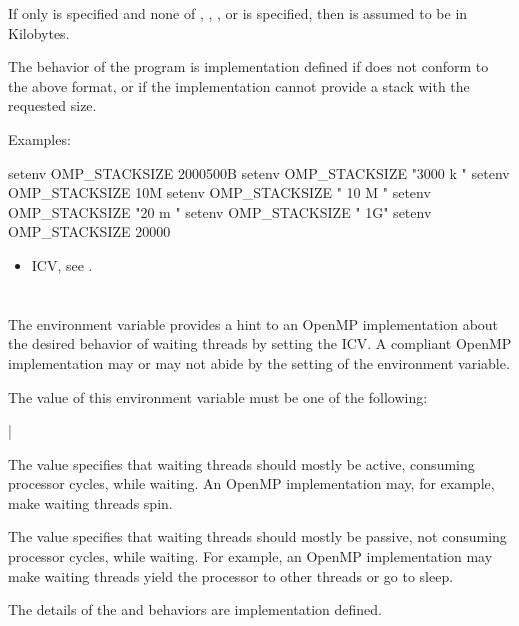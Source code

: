 If only  is specified and none of , , , 
or  is specified, then  is assumed to be in Kilobytes.

The behavior of the program is implementation defined if  
does not conform to the above format, or if the implementation cannot provide 
a stack with the requested size.

Examples:
\begin{ompEnv}
setenv OMP_STACKSIZE 2000500B
setenv OMP_STACKSIZE "3000 k "
setenv OMP_STACKSIZE 10M
setenv OMP_STACKSIZE " 10 M "
setenv OMP_STACKSIZE "20 m "
setenv OMP_STACKSIZE " 1G"
setenv OMP_STACKSIZE 20000
\end{ompEnv}

\crossreferences
\begin{itemize}
\item {} ICV, see .
\end{itemize}



\section{}
\label{sec:OMP_WAIT_POLICY}
The  environment variable provides a hint to an OpenMP
implementation about the desired behavior of waiting threads by setting the
 ICV. A compliant OpenMP implementation may or may not 
abide by the setting of the environment variable.

The value of this environment variable must be one of the following:

{|}

The  value specifies that waiting threads should mostly be 
active, consuming processor cycles, while waiting. An OpenMP implementation 
may, for example, make waiting threads spin.

The  value specifies that waiting threads should mostly be 
passive, not consuming processor cycles, while waiting. For example, an 
OpenMP implementation may make waiting threads yield the processor to 
other threads or go to sleep.

The details of the  and  behaviors are 
implementation defined.

